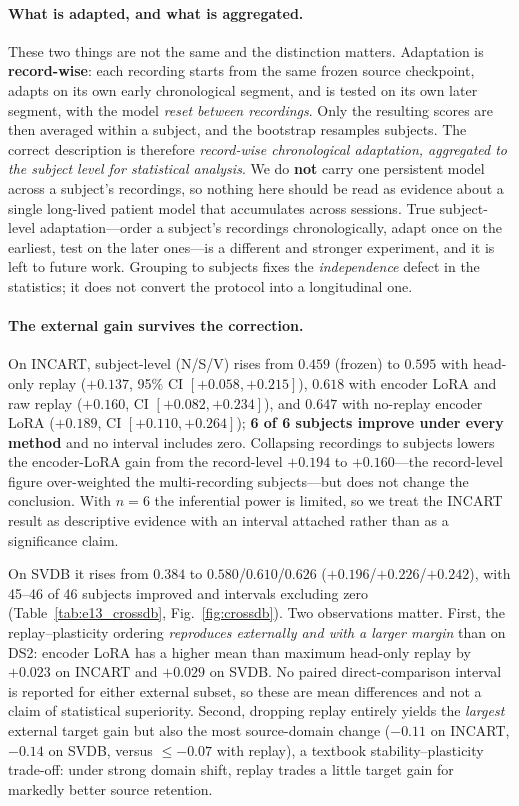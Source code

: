 \paragraph{What is adapted, and what is aggregated.} These two things are not the
same and the distinction matters. Adaptation is \textbf{record-wise}: each
recording starts from the same frozen source checkpoint, adapts on its own early
chronological segment, and is tested on its own later segment, with the model
\emph{reset between recordings}. Only the resulting scores are then averaged
within a subject, and the bootstrap resamples subjects. The correct description
is therefore \emph{record-wise chronological adaptation, aggregated to the
subject level for statistical analysis}. We do \textbf{not} carry one persistent
model across a subject's recordings, so nothing here should be read as evidence
about a single long-lived patient model that accumulates across sessions. True
subject-level adaptation---order a subject's recordings chronologically, adapt
once on the earliest, test on the later ones---is a different and stronger
experiment, and it is left to future work. Grouping to subjects fixes the
\emph{independence} defect in the statistics; it does not convert the protocol
into a longitudinal one.

\paragraph{The external gain survives the correction.} On INCART, subject-level
\macrof{} (N/S/V) rises from $0.459$ (frozen) to $0.595$ with head-only replay
($+0.137$, 95\% CI $[+0.058,+0.215]$), $0.618$ with encoder LoRA and raw replay
($+0.160$, CI $[+0.082,+0.234]$), and $0.647$ with no-replay encoder LoRA
($+0.189$, CI $[+0.110,+0.264]$); \textbf{6 of 6 subjects improve under every
method} and no interval includes zero. Collapsing recordings to subjects lowers
the encoder-LoRA gain from the record-level $+0.194$ to $+0.160$---the
record-level figure over-weighted the multi-recording subjects---but does not
change the conclusion. With $n = 6$ the inferential power is limited, so we treat
the INCART result as descriptive evidence with an interval attached rather than
as a significance claim.

On SVDB it rises from $0.384$ to $0.580$/$0.610$/$0.626$
($+0.196$/$+0.226$/$+0.242$), with 45--46 of 46 subjects improved and intervals
excluding zero (Table~\ref{tab:e13_crossdb}, Fig.~\ref{fig:crossdb}). Two
observations matter. First, the replay--plasticity ordering \emph{reproduces
externally and with a larger margin} than on DS2: encoder LoRA has a higher mean
than maximum head-only replay by $+0.023$ on INCART and $+0.029$ on SVDB. No
paired direct-comparison interval is reported for either external subset, so
these are mean differences and not a claim of statistical superiority. Second, dropping
replay entirely yields the \emph{largest} external target gain but also the most
source-domain change ($-0.11$ on INCART, $-0.14$ on SVDB, versus $\le -0.07$ with
replay), a textbook stability--plasticity trade-off: under strong domain shift,
replay trades a little target gain for markedly better source retention.

